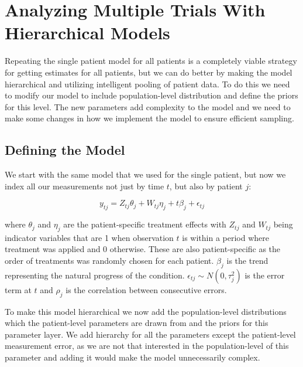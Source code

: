 \documentclass[12pt,a4paper,leqno]{report}
\theoremstyle{plain}
\theoremstyle{definition}
\theoremstyle{remark}
\begin{document}
\section{Analyzing Multiple Trials With Hierarchical Models}\label{pooling}

Repeating the single patient model for all patients is a completely viable strategy for
getting estimates for all patients, but we can do better by making the model
hierarchical and utilizing intelligent pooling of patient data. To do this we need to
modify our model to include population-level distribution and define the priors for this
level. The new parameters add complexity to the model and we need to make some changes
in how we implement the model to ensure efficient sampling.

\subsection{Defining the Model}\label{hiermodel}

We start with the same model that we used for the single patient, but now we index all our
measurements not just by time \(t\), but also by patient \(j\):

\begin{def}\label{hierarchicalmodel}
    \begin{equation}\label{}
        y_{tj} = Z_{tj}\theta_{j} + W_{tj}\eta_{j} + t\beta_{j} + \epsilon_{tj}
    \end{equation}
\end{def} where \(\theta_{j} \) and \(\eta_{j} \) are the patient-specific treatment
effects with \(Z_{tj}\) and \(W_{tj}\) being indicator
variables that are 1 when observation \(t\) is within a period where treatment was applied and
0 otherwise. These are also patient-specific as the order of treatments was randomly
chosen for each patient. \(\beta_j\) is the trend representing the natural progress of the
condition. \(\epsilon_{tj} \sim N(0,\tau_j^2) \) is the error term at \(t\) and
\(\rho_j\) is the correlation between consecutive errors.

To make this model hierarchical we now add the population-level distributions which
the patient-level parameters are drawn from and the priors for this parameter layer.
We add hierarchy for all the parameters except the patient-level measurement error, as
we are not that interested in the population-level of this parameter and adding it
would make the model unnecessarily complex.
\end{document}
